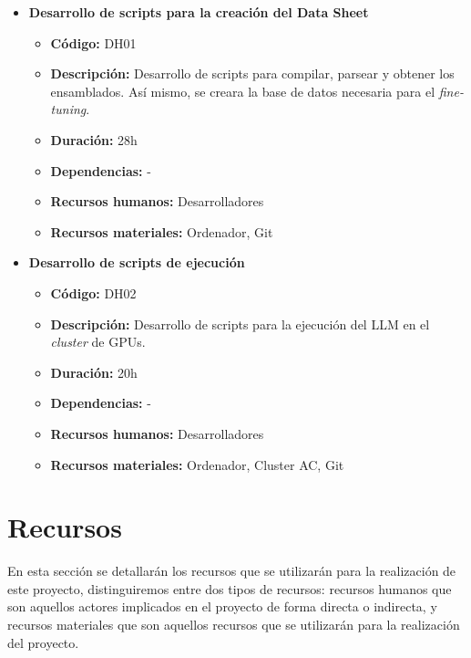 
\begin{itemize}
    \item \textbf{Desarrollo de scripts para la creación del Data Sheet}
        \begin{itemize}
            \item \textbf{Código:} DH01
            \item \textbf{Descripción:} Desarrollo de scripts para compilar, parsear y obtener los ensamblados. Así mismo, se creara la base de datos
                necesaria para el \textit{fine-tuning}.
            \item \textbf{Duración:} 28h
            \item \textbf{Dependencias:} -
            \item \textbf{Recursos humanos:} Desarrolladores
            \item \textbf{Recursos materiales:} Ordenador, Git
        \end{itemize}
    \item \textbf{Desarrollo de scripts de ejecución}
        \begin{itemize}
            \item \textbf{Código:} DH02
            \item \textbf{Descripción:} Desarrollo de scripts para la ejecución del LLM en el \textit{cluster} de GPUs.
            \item \textbf{Duración:} 20h
            \item \textbf{Dependencias:} -
            \item \textbf{Recursos humanos:} Desarrolladores
            \item \textbf{Recursos materiales:} Ordenador, Cluster AC, Git
        \end{itemize}
\end{itemize}

\section{Recursos}
\label{subsec:recursos}


En esta sección se detallarán los recursos que se utilizarán para la realización de este proyecto, distinguiremos entre dos tipos
de recursos: recursos humanos que son aquellos actores implicados en el proyecto de forma directa o indirecta, y recursos materiales
que son aquellos recursos que se utilizarán para la realización del proyecto.

